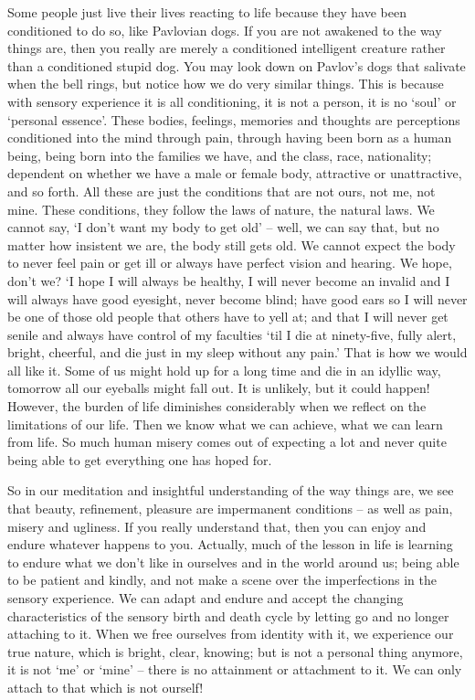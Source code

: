 Some people just live their lives reacting to life because they have been conditioned to do so, like Pavlovian dogs. If you are not awakened to the way things are, then you really are merely a conditioned intelligent creature rather than a conditioned stupid dog. You may look down on Pavlov's dogs that salivate when the bell rings, but notice how we do very similar things. This is because with sensory experience it is all conditioning, it is not a person, it is no `soul' or `personal essence'. These bodies, feelings, memories and thoughts are perceptions conditioned into the mind through pain, through having been born as a human being, being born into the families we have, and the class, race, nationality; dependent on whether we have a male or female body, attractive or unattractive, and so forth. All these are just the conditions that are not ours, not me, not mine. These conditions, they follow the laws of nature, the natural laws. We cannot say, `I don't want my body to get old' -- well, we can say that, but no matter how insistent we are, the body still gets old. We cannot expect the body to never feel pain or get ill or always have perfect vision and hearing. We hope, don't we? `I hope I will always be healthy, I will never become an invalid and I will always have good eyesight, never become blind; have good ears so I will never be one of those old people that others have to yell at; and that I will never get senile and always have control of my faculties `til I die at ninety-five, fully alert, bright, cheerful, and die just in my sleep without any pain.' That is how we would all like it. Some of us might hold up for a long time and die in an idyllic way, tomorrow all our eyeballs might fall out. It is unlikely, but it could happen! However, the burden of life diminishes considerably when we reflect on the limitations of our life. Then we know what we can achieve, what we can learn from life. So much human misery comes out of expecting a lot and never quite being able to get everything one has hoped for.

So in our meditation and insightful understanding of the way things are, we see that beauty, refinement, pleasure are impermanent conditions -- as well as pain, misery and ugliness. If you really understand that, then you can enjoy and endure whatever happens to you. Actually, much of the lesson in life is learning to endure what we don't like in ourselves and in the world around us; being able to be patient and kindly, and not make a scene over the imperfections in the sensory experience. We can adapt and endure and accept the changing characteristics of the sensory birth and death cycle by letting go and no longer attaching to it. When we free ourselves from identity with it, we experience our true nature, which is bright, clear, knowing; but is not a personal thing anymore, it is not `me' or `mine' -- there is no attainment or attachment to it. We can only attach to that which is not ourself!

